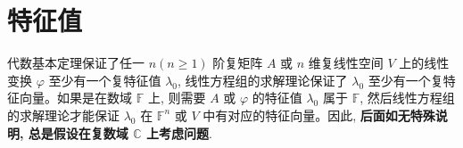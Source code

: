 \documentclass[../main.tex]{subfiles} %
\begin{document}
\chapter{特征值}

\begin{remark}
代数基本定理保证了任一 $n(n \geqslant  1)$ 阶复矩阵 $A$ 或 $n$ 维复线性空间 $V$ 上的线性变换 $\varphi$ 至少有一个复特征值 $\lambda_0$, 线性方程组的求解理论保证了 $\lambda_0$ 至少有一个复特征向量。如果是在数域 $\mathbb{F}$ 上, 则需要 $A$ 或 $\varphi$ 的特征值 $\lambda_0$ 属于 $\mathbb{F}$, 然后线性方程组的求解理论才能保证 $\lambda_0$ 在 $\mathbb{F}^n$ 或 $V$ 中有对应的特征向量。因此, \textbf{后面如无特殊说明, 总是假设在复数域 $\mathbb{C}$ 上考虑问题}.
\end{remark}

% 




















\end{document}
